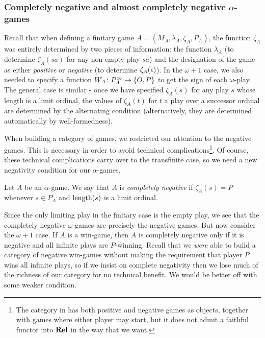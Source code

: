 \documentclass[11pt]{article} %
\begin{document}
\subsubsection{Completely negative and almost completely negative $\alpha$-games}

Recall that when defining a finitary game $A=(M_A,\lambda_A,\zeta_A,P_A)$, the function $\zeta_A$ was entirely determined by two pieces of information: the function $\lambda_A$ (to determine $\zeta_A(sa)$ for any non-empty play $sa$) and the designation of the game as either \emph{positive} or \emph{negative} (to determine $\zeta_A(\epsilon)$).  In the $\omega+1$ case, we also needed to specify a function $W_A\colon{}P_A^\infty\to{}\{O,P\}$ to get the sign of each $\omega$-play.  The general case is similar - once we have specified $\zeta_A(s)$ for any play $s$ whose length is a limit ordinal, the values of $\zeta_A(t)$ for $t$ a play over a successor ordinal are determined by the alternating condition (alternatively, they are determined automatically by well-formedness).  

When building a category of games, we restricted our attention to the negative games.  This is necessary in order to avoid technical complications\footnote{The category in \cite{abramskyjagadeesangames} has both positive and negative games as objects, together with games where either player may start, but it does not admit a faithful functor into ${\normalfont\textbf{Rel}}$ in the way that we want.}.  Of course, these technical complications carry over to the transfinite case, so we need a new negativity condition for our $\alpha$-games.

\begin{definition}
  Let $A$ be an $\alpha$-game.  We say that $A$ is \emph{completely negative} if $\zeta_A(s)=P$ whenever $s\in P_A$ and $\operatorname{length}(s)$ is a limit ordinal.
\end{definition}

Since the only limiting play in the finitary case is the empty play, we see that the completely negative $\omega$-games are precisely the negative games.  But now consider the $\omega+1$ case.  If $A$ is a win-game, then $A$ is completely negative only if it is negative and all infinite plays are $P$-winning.  Recall that we \emph{were} able to build a category of negative win-games without making the requirement that player $P$ wins all infinite plays, so if we insist on complete negativity then we lose much of the richness of our category for no technical benefit.  We would be better off with some weaker condition.
\end{document}
